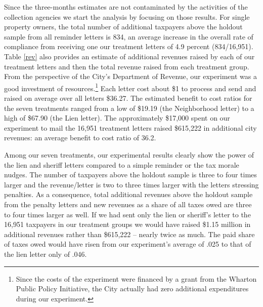 \documentclass[12pt]{article}
\begin{document}
Since the three-months estimates are not contaminated by the activities
of the collection agencies we start the analysis by focusing on those
results.  For single property owners, the total number of additional
taxpayers above the holdout sample from all reminder letters is 834,
an average increase in the overall rate of compliance from receiving
one our treatment letters of 4.9 percent (834/16,951).  Table
\ref{rev} also provides an estimate of additional revenues raised by
each of our treatment letters and then the total revenue raised from
each treatment group.  From the perspective of the City's Department
of Revenue, our experiment was a good investment of resources.\footnote{
Since the costs of the experiment were financed by a grant from the
Wharton Public Policy Initiative, the City actually had zero additional
expenditures during our experiment.} Each letter cost about \$1 to process and send and raised
on average over all letters \$36.27.  The estimated benefit to cost
ratios for the seven treatments ranged from a low of \$19.19 (the
Neighborhood letter) to a high of \$67.90 (the Lien letter).  The
approximately \$17,000 spent on our experiment to mail the 16,951
treatment letters raised \$615,222 in additional city revenues: an
average benefit to cost ratio of 36.2.

Among our seven treatments, our experimental results clearly show the
power of the lien and sheriff letters compared to a simple reminder or
the tax morale nudges.  The number of taxpayers above the holdout
sample is three to four times larger and the revenue/letter is two to
three times larger with the letters stressing penalties.  As a
consequence, total additional revenues above the holdout sample from the
penalty letters and new revenues as a share of all taxes owed are
three to four times larger as well.  If we had sent only the lien or
sheriff's letter to the 16,951 taxpayers in our treatment groups we
would have raised \$1.15 million in additional revenues rather than \$615,222
-- nearly twice as much.  The paid share of taxes owed would have
risen from our experiment's average of .025 to that of the lien letter
only of .046.
\end{document}
